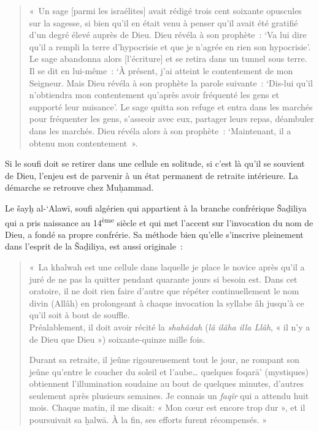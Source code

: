 \begin{quote}
«~Un sage {[}parmi les israélites{]} avait rédigé trois cent soixante
opuscules sur la sagesse, si bien qu'il en était venu à penser qu'il
avait été gratifié d'un degré élevé auprès de Dieu. Dieu révéla à son
prophète~: `Va lui dire qu'il a rempli la terre d'hypocrisie et que je
n'agrée en rien son hypocrisie'. Le sage abandonna alors
{[}l'écriture{]} et se retira dans un tunnel sous terre. Il se dit en
lui-même~: `À présent, j'ai atteint le contentement de mon Seigneur.
Mais Dieu révéla à son prophète la parole suivante~: `Dis-lui qu'il
n'obtiendra mon contentement qu'après avoir fréquenté les gens et
supporté leur nuisance'. Le sage quitta son refuge et entra dans les
marchés pour fréquenter les gens, s'asseoir avec eux, partager leurs
repas, déambuler dans les marchés. Dieu révéla alors à son prophète~:
`Maintenant, il a obtenu mon contentement~».
\end{quote}

Si le soufi doit se retirer dans une cellule en solitude, si c'est là
qu'il se souvient de Dieu, l'enjeu est de parvenir à un état permanent
de retraite intérieure. La démarche se retrouve chez Muḥammad.

Le šayḫ al-`Alawī, soufi algérien qui appartient à la branche
confrérique Šaḏiliya qui a pris naissance au 14\textsuperscript{ème}
siècle et qui met l'accent sur l'invocation du nom de Dieu, a fondé sa
propre confrérie. Sa méthode bien qu'elle s'inscrive pleinement dans
l'esprit de la Šaḏiliya, est aussi originale~:

\begin{quote}
«~La khalwah est une cellule dans laquelle je place le novice après
qu'il a juré de ne pas la quitter pendant quarante jours si besoin est.
Dans cet oratoire, il ne doit rien faire d'autre que répéter
continuellement le nom divin (Allâh) en prolongeant à chaque invocation
la syllabe âh jusqu'à ce qu'il soit à bout de souffle.\\
Préalablement, il doit avoir récité la \emph{shahâdah} (\emph{lâ ilâha
illa Llâh}, « il n'y a de Dieu que Dieu ») soixante-quinze mille fois.

Durant sa retraite, il jeûne rigoureusement tout le jour, ne rompant son
jeûne qu'entre le coucher du soleil et l'aube\ldots{} quelques foqarā'
(mystiques) obtiennent l'illumination soudaine au bout de quelques
minutes, d'autres seulement après plusieurs semaines. Je connais un
\emph{faqîr} qui a attendu huit mois. Chaque matin, il me disait: « Mon
cœur est encore trop dur », et il poursuivait sa ḫalwā. À la fin, ses
efforts furent récompensés. »
\end{quote}

